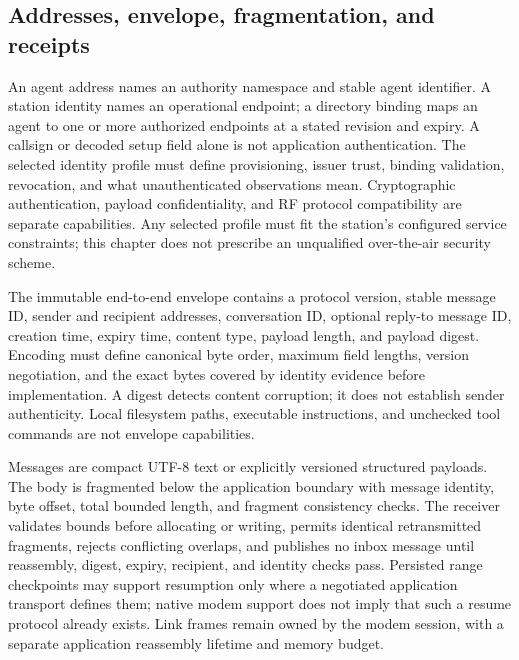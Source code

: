
\subsection{Addresses, envelope, fragmentation, and receipts}
An agent address names an authority namespace and stable agent identifier.
A station identity names an operational endpoint; a directory binding maps
an agent to one or more authorized endpoints at a stated revision and expiry.
A callsign or decoded setup field alone is not application authentication.
The selected identity profile must define provisioning, issuer trust,
binding validation, revocation, and what unauthenticated observations mean.
Cryptographic authentication, payload confidentiality, and RF protocol
compatibility are separate capabilities. Any selected profile must fit the
station's configured service constraints; this chapter does not prescribe an
unqualified over-the-air security scheme.

The immutable end-to-end envelope contains a protocol version, stable message
ID, sender and recipient addresses, conversation ID, optional reply-to message
ID, creation time, expiry time, content type, payload length, and payload
digest. Encoding must define canonical byte order, maximum field lengths,
version negotiation, and the exact bytes covered by identity evidence before
implementation. A digest detects content corruption; it does not establish
sender authenticity. Local filesystem paths, executable instructions, and
unchecked tool commands are not envelope capabilities.

Messages are compact UTF-8 text or explicitly versioned structured payloads.
The body is fragmented below the application boundary with message identity,
byte offset, total bounded length, and fragment consistency checks. The
receiver validates bounds before allocating or writing, permits identical
retransmitted fragments, rejects conflicting overlaps, and publishes no inbox
message until reassembly, digest, expiry, recipient, and identity checks pass.
Persisted range checkpoints may support resumption only where a negotiated
application transport defines them; native modem support does not imply that
such a resume protocol already exists. Link frames remain owned by the modem
session, with a separate application reassembly lifetime and memory budget.

